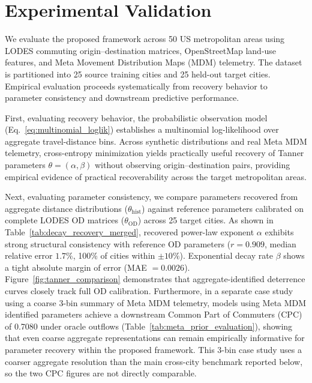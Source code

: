 \documentclass[pdflatex,sn-basic,iicol]{sn-jnl}
\begin{document}
\section{Experimental Validation}\label{sec:results}

We evaluate the proposed framework across 50 US metropolitan areas using LODES commuting origin--destination matrices, OpenStreetMap land-use features, and Meta Movement Distribution Maps (MDM) telemetry. The dataset is partitioned into 25 source training cities and 25 held-out target cities. Empirical evaluation proceeds systematically from recovery behavior to parameter consistency and downstream predictive performance.

First, evaluating recovery behavior, the probabilistic observation model (Eq.~\ref{eq:multinomial_loglik}) establishes a multinomial log-likelihood over aggregate travel-distance bins. Across synthetic distributions and real Meta MDM telemetry, cross-entropy minimization yields practically useful recovery of Tanner parameters $\theta = (\alpha, \beta)$ without observing origin--destination pairs, providing empirical evidence of practical recoverability across the target metropolitan areas.

Next, evaluating parameter consistency, we compare parameters recovered from aggregate distance distributions ($\theta_{\text{hist}}$) against reference parameters calibrated on complete LODES OD matrices ($\theta_{\text{OD}}$) across 25 target cities. As shown in Table~\ref{tab:decay_recovery_merged}, recovered power-law exponent $\alpha$ exhibits strong structural consistency with reference OD parameters ($r = 0.909$, median relative error $1.7\%$, 100\% of cities within $\pm 10\%$). Exponential decay rate $\beta$ shows a tight absolute margin of error (MAE $= 0.0026$). Figure~\ref{fig:tanner_comparison} demonstrates that aggregate-identified deterrence curves closely track full OD calibration. Furthermore, in a separate case study using a coarse 3-bin summary of Meta MDM telemetry, models using Meta MDM identified parameters achieve a downstream Common Part of Commuters (CPC) of 0.7080 under oracle outflows (Table~\ref{tab:meta_prior_evaluation}), showing that even coarse aggregate representations can remain empirically informative for parameter recovery within the proposed framework. This 3-bin case study uses a coarser aggregate resolution than the main cross-city benchmark reported below, so the two CPC figures are not directly comparable.
\end{document}
